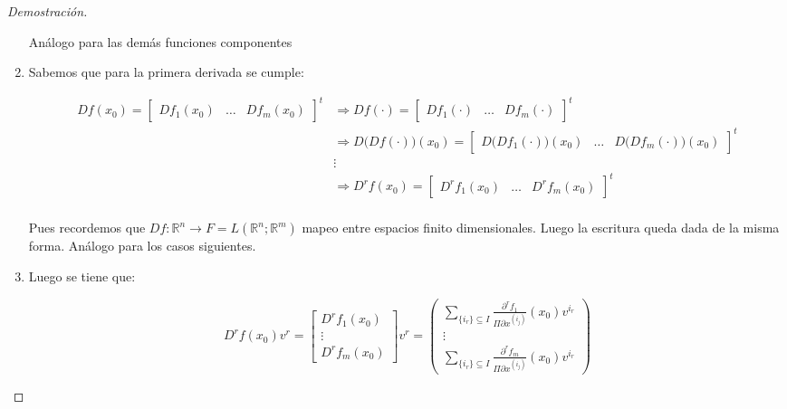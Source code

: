 \begin{proof}[Demostración]
\begin{enumerate}
		Análogo para las demás funciones componentes 
		
		\item Sabemos que para la primera derivada se cumple:
		
		\begin{align*}
			Df(x_0) = \begin{bmatrix}
				Df_1(x_0) & \dots & Df_m(x_0)
			\end{bmatrix}^t &\Rightarrow Df(\cdot) = \begin{bmatrix}
				Df_1(\cdot) & \dots & Df_m(\cdot)
			\end{bmatrix}^t \\
			&\Rightarrow D \bigg(Df(\cdot)\bigg) (x_0) = \begin{bmatrix}
				D \bigg(Df_1(\cdot)\bigg) (x_0) & \dots & D\bigg(Df_m(\cdot)\bigg) (x_0)
			\end{bmatrix}^t \\
			& \vdots\\
			&\Rightarrow D^rf(x_0) = \begin{bmatrix}
				D^r f_1 (x_0) & \dots & D^rf_m (x_0)
			\end{bmatrix}^t \\
		\end{align*}
		
		
		Pues recordemos que $Df:\mathbb{R}^n \to F = L(\mathbb{R}^n;\mathbb{R}^m)$ mapeo entre espacios finito dimensionales. Luego la escritura queda dada de la misma forma. Análogo para los casos siguientes. 
		
		
		\item Luego se tiene que:
		
		\begin{equation*}
			D^r f(x_0) v^r = \begin{bmatrix}
				D^r f_1 (x_0) \\
				\vdots \\
				D^rf_m (x_0)
			\end{bmatrix} v^r = \begin{pmatrix}
				\displaystyle \sum_{\{i_r\}\subseteq I} \frac{\partial^r f_1}{\Pi \partial x^{(i_j)}} (x_0)v^{i_r} \\
				\vdots\\
				\displaystyle  \sum_{\{i_r\}\subseteq I} \frac{\partial^r f_m}{\Pi \partial x^{(i_j)}}(x_0) v^{i_r} 
			\end{pmatrix} 
		\end{equation*}
	\end{enumerate}
\end{proof}

